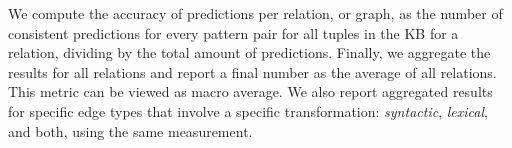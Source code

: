 We compute the accuracy of predictions per relation, or graph, as the number of consistent predictions for every pattern pair for all tuples in the KB for a relation, dividing by the total amount of predictions.
Finally, we aggregate the results for all relations and report a final number as the average of all relations. This metric can be viewed as macro average.
We also report aggregated results for specific edge types that involve a specific transformation: \textit{syntactic}, \textit{lexical}, and both, using the same measurement. 

